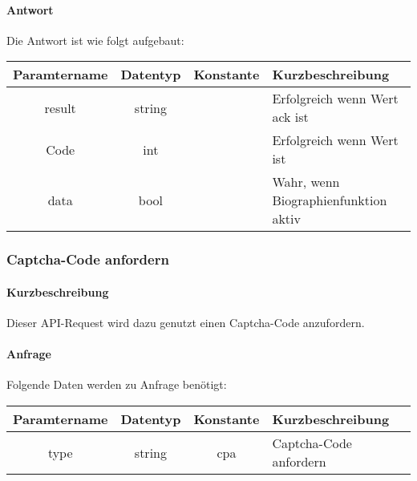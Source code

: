 \paragraph{Antwort}Die Antwort ist wie folgt aufgebaut:
\begin{table}[H]
	\begin{tabular}{|c|c|c|p{6.5cm}|}
		\hline
		\textbf{Paramtername} & \textbf{Datentyp} & \textbf{Konstante} & \textbf{Kurzbeschreibung}                                                                                               \\ \hline
		result              & string           &                 & Erfolgreich wenn Wert {\glqq ack\grqq} ist \\ \hline
		Code                & int              &                 & Erfolgreich wenn Wert {\glqq 0\grqq} ist \\ \hline
		data                & bool             &                 & Wahr, wenn Biographienfunktion aktiv \\ \hline
	\end{tabular}
\end{table}

\subsubsection{Captcha-Code anfordern}
\paragraph{Kurzbeschreibung}Dieser API-Request wird dazu genutzt einen Captcha-Code anzufordern.
\paragraph{Anfrage}Folgende Daten werden zu Anfrage benötigt:
\begin{table}[H]
	\begin{tabular}{|c|c|c|p{6.5cm}|}
		\hline
		\textbf{Paramtername} & \textbf{Datentyp} & \textbf{Konstante} & \textbf{Kurzbeschreibung}                                                                                               \\ \hline
		type                & string            & cpa                & Captcha-Code anfordern \\ \hline
	\end{tabular}
\end{table}

